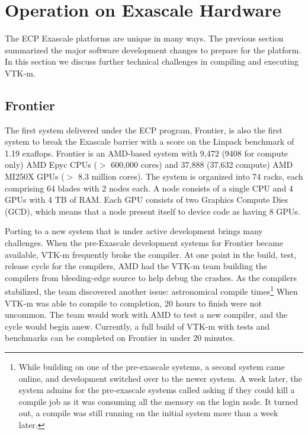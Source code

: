 \section{Operation on Exascale Hardware}

The ECP Exascale platforms are unique in many ways.
The previous section summarized the major software development changes to prepare for the platform.
In this section we discuss further technical challenges in compiling and executing VTK-m.


\subsection{Frontier}
The first system delivered under the ECP program, Frontier, is also the first system to break the Exascale barrier with a score on the Linpack benchmark of 1.19 exaflops. Frontier is an AMD-based system with 9,472 (9408 for compute only) AMD Epyc CPUs ($>$ 600,000 cores) and 37,888 (37,632 compute) AMD MI250X GPUs ($>$ 8.3 million cores). The system is organized into 74 racks, each comprising 64 blades with 2 nodes each. A node consists of a single CPU and 4 GPUs with 4 TB of RAM. Each GPU consists of two Graphics Compute Dies (GCD), which means that a node present itself to device code as having 8 GPUs.

Porting to a new system that is under active development brings many challenges. When the pre-Exascale development systems for Frontier became available, VTK-m frequently broke the compiler. At one point in the build, test, release cycle for the compilers, AMD had the VTK-m team building the compilers from bleeding-edge source to help debug the crashes. As the compilers stabilized, the team discovered another issue: astronomical compile times\footnote{While building on one of the pre-exascale systems, a second system came online, and development switched over to the newer system. A week later, the system admins for the pre-exascale systems called asking if they could kill a compile job as it was consuming all the memory on the login node. It turned out, a compile was still running on the initial system more than a week later.} When VTK-m was able to compile to completion, 20 hours to finish were not uncommon. The team would work with AMD to test a new compiler, and the cycle would begin anew. Currently, a full build of VTK-m with tests and benchmarks can be completed on Frontier in under 20 minutes.

